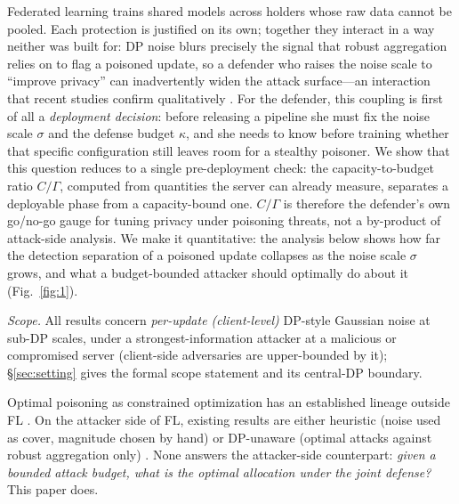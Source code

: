 \documentclass[final,1p,times]{elsarticle}
\begin{document}
Federated learning \cite{mcmahan2017,kairouz2021advances,li2020federated}
trains shared models across holders whose raw data cannot be pooled. Each
protection is justified on its own; together they interact in a way neither
was built for: DP noise
\cite{dwork2006calibrating,abadi2016,mcmahan2018dp,geyer2017dp} blurs
precisely the signal that robust aggregation
\cite{blanchard2017,yin2018,cao2021fltrust,nguyen2022flame} relies on to
flag a poisoned update, so a defender who raises the noise scale to
``improve privacy'' can inadvertently widen the attack surface---an
interaction that recent studies confirm qualitatively
\cite{mothukuri2021survey,hossain2025mpelm,wang2025ldpfl}. For the defender, this coupling is
first of all a \emph{deployment decision}: before releasing a pipeline
she must fix the noise scale $\sigma$ and the defense budget $\kappa$,
and she needs to know before training whether that specific
configuration still leaves room for a stealthy poisoner. We show
that this question reduces to a single pre-deployment check: the
capacity-to-budget ratio $C/\Gamma$, computed from quantities the server
can already measure, separates a deployable phase from a capacity-bound
one. $C/\Gamma$ is therefore the defender's own go/no-go gauge for
tuning privacy under poisoning threats, not a by-product of attack-side
analysis. We make it quantitative: the
analysis below shows how far the detection separation of a poisoned
update collapses as the noise scale $\sigma$ grows, and what a
budget-bounded attacker should optimally do about it (Fig.~\ref{fig:1}).

\emph{Scope.} All results concern \emph{per-update (client-level)}
DP-style Gaussian noise at sub-DP scales, under a strongest-information
attacker at a malicious or compromised server (client-side adversaries
are upper-bounded by it); \S\ref{sec:setting} gives the formal scope
statement and its central-DP boundary.

Optimal poisoning as constrained optimization has an established
lineage outside FL \cite{biggio2012poisoning,meizhu2015teaching}. On
the attacker side of FL, existing results are either heuristic (noise
used as cover, magnitude chosen by hand) or DP-unaware (optimal
attacks against robust aggregation only)
\cite{shejwalkar2021turning,bhagoji2019analyzing,fang2020local}. None
answers the attacker-side counterpart: \emph{given a bounded attack
budget, what is the optimal allocation under the joint defense?} This
paper does.
\end{document}

